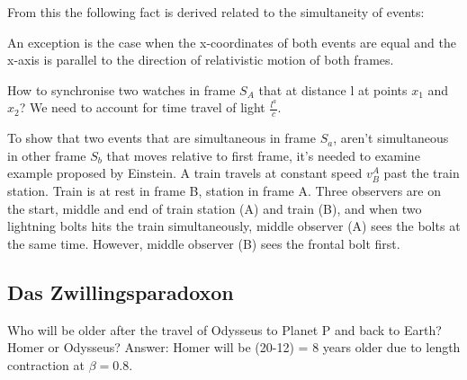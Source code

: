 \documentclass{report}
\begin{document}
From this the following fact is derived related to the simultaneity of events:

An exception is the case when the x-coordinates of both events are equal and the x-axis is parallel to the direction of relativistic motion of both frames.

How to synchronise two watches in frame $S_A$ that at distance l at points $x_1$ and $x_2$? We need to account for time travel of light $\frac{l^a}{c}$. 


To show that two events that are simultaneous in frame $S_a$, aren't simultaneous in other frame $S_b$ that moves relative to first frame, it's needed to examine example proposed by Einstein. A train travels at constant speed $v_B^A$ past the train station. Train is at rest in frame B, station in frame A. Three observers are on the start, middle and end of train station (A) and train (B), and when two lightning bolts hits the train simultaneously, middle observer (A) sees the bolts at the same time. However, middle observer (B) sees the frontal bolt first.

\subsection{Das Zwillingsparadoxon}
Who will be older after the travel of Odysseus to Planet P and back to Earth? Homer or Odysseus? Answer: Homer will be (20-12) = 8 years older due to length contraction at $\beta = 0.8$. 
\end{document}
